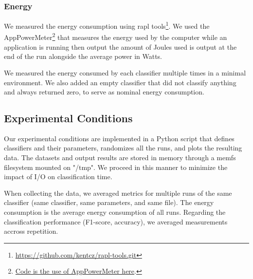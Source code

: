 \subsubsection{Energy}
We measured the energy consumption using rapl
tools\footnote{\url{https://github.com/kentcz/rapl-tools.git}}.  We used the
AppPowerMeter\footnote{\href{https://github.com/azazel7/paper-benchmark/blob/9adb1039c5a65a00a66d554f0e870d14d3fff7cb/makefile.py\#L122}{Code
is the use of AppPowerMeter here}.} that measures the energy used by the
computer while an application is running then output the amount of Joules used
is output at the end of the run alongside the average power in Watts.

We measured the energy consumed by each classifier
multiple times in a minimal environment. We also added an empty
classifier that did not classify anything and always
returned zero, to serve as nominal energy consumption.

\subsection{Experimental Conditions}
Our experimental conditions are implemented in a Python script that defines
classifiers and their parameters, randomizes all the runs, and plots the
resulting data. The datasets and output results are stored in memory
through a memfs filesystem mounted on "/tmp". We proceed in this manner to
minimize the impact of I/O on classification time.

When collecting the data, we averaged metrics for multiple runs of the same
classifier (same classifier, same parameters, and same file). The energy
consumption is the average energy consumption of all runs. Regarding the
classification performance (F1-score, accuracy), we averaged measurements
accross repetition.

